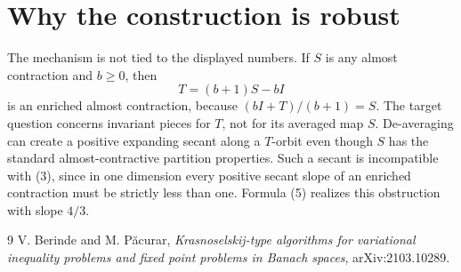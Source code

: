\documentclass[11pt]{article}
\begin{document}
\section{Why the construction is robust}

The mechanism is not tied to the displayed numbers.  If \(S\) is any almost
contraction and \(b\ge0\), then
\[
 T=(b+1)S-bI
\]
is an enriched almost contraction, because \((bI+T)/(b+1)=S\).  The target
question concerns invariant pieces for \(T\), not for its averaged map
\(S\).  De-averaging can create a positive expanding secant along a
\(T\)-orbit even though \(S\) has the standard almost-contractive partition
properties.  Such a secant is incompatible with (3), since in one dimension
every positive secant slope of an enriched contraction must be strictly less
than one.  Formula (5) realizes this obstruction with slope \(4/3\).

\begin{thebibliography}{9}
V. Berinde and M. P\u acurar,
\emph{Krasnoselskij-type algorithms for variational inequality problems and
fixed point problems in Banach spaces}, arXiv:2103.10289.
\end{thebibliography}
\end{document}
